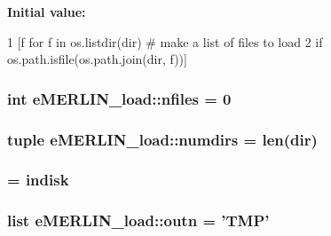 {\bfseries \-Initial value\-:}
\begin{DoxyCode}
1 [f for f in os.listdir(dir)             # make a list of files to load
2         if os.path.isfile(os.path.join(dir, f))]
\end{DoxyCode}
\hypertarget{namespacee_m_e_r_l_i_n__load_a2ec20a600a1d5f0b51b5eddc67ab3d67}{
\subsubsection[{nfiles}]{\setlength{\rightskip}{0pt plus 5cm}int {\bf e\-M\-E\-R\-L\-I\-N\-\_\-load\-::nfiles} = 0}}\label{namespacee_m_e_r_l_i_n__load_a2ec20a600a1d5f0b51b5eddc67ab3d67}
\hypertarget{namespacee_m_e_r_l_i_n__load_a41b837603f274d41cb8c83c654ebc48d}{
\subsubsection[{numdirs}]{\setlength{\rightskip}{0pt plus 5cm}tuple {\bf e\-M\-E\-R\-L\-I\-N\-\_\-load\-::numdirs} = len(dir)}}\label{namespacee_m_e_r_l_i_n__load_a41b837603f274d41cb8c83c654ebc48d}
\hypertarget{namespacee_m_e_r_l_i_n__load_a1b1907c1f32abe6b155fca3b653b8150}{
\subsubsection[{outdisk}]{ = {\bf indisk}}}\label{namespacee_m_e_r_l_i_n__load_a1b1907c1f32abe6b155fca3b653b8150}
\hypertarget{namespacee_m_e_r_l_i_n__load_a576f868967e79fe52b54cc6f787f4f88}{
\subsubsection[{outn}]{\setlength{\rightskip}{0pt plus 5cm}list {\bf e\-M\-E\-R\-L\-I\-N\-\_\-load\-::outn} = '\-T\-M\-P'}}\label{namespacee_m_e_r_l_i_n__load_a576f868967e79fe52b54cc6f787f4f88}
